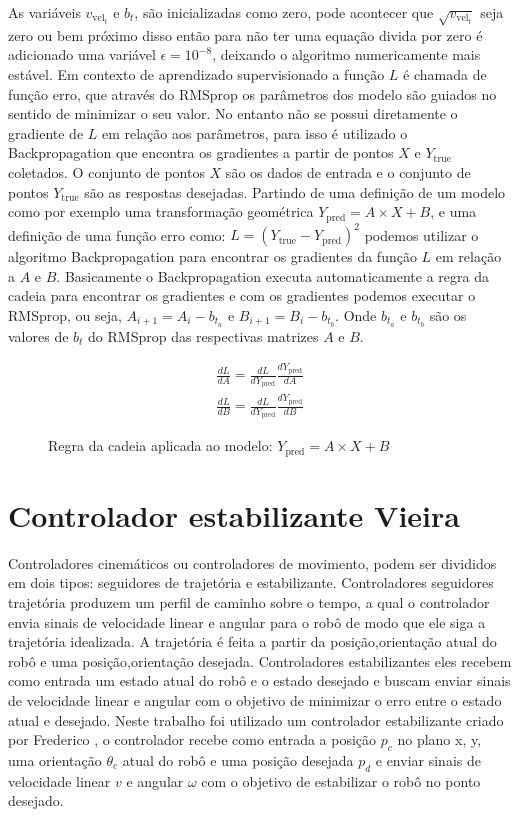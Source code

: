 As variáveis $v_{\text{vel}_t}$ e  $b_t$, são inicializadas como zero, pode acontecer
que  $\sqrt{v_{\text{vel}_t}}$ seja zero ou bem próximo disso então para não ter uma equação
divida por zero é adicionado uma variável $\epsilon =10^{-8}$, deixando o algoritmo numericamente
mais estável. Em contexto de aprendizado supervisionado a função $L$ é chamada de função erro, que 
através do RMSprop os parâmetros dos modelo são guiados no sentido de minimizar o seu valor.
No entanto não se possui diretamente o gradiente de $L$ em relação aos parâmetros, para isso
é utilizado o  Backpropagation que encontra os gradientes a partir
de pontos $X$ e $Y_{\text{true}}$ coletados. O conjunto de pontos $X$ são
os dados de entrada
e o conjunto de pontos  $Y_{\text{true}}$ são as respostas desejadas.
Partindo de  uma definição de um modelo como por exemplo uma
transformação geométrica $Y_{\text{pred}}= A \times X + B$, e uma definição de uma função
erro como: $L=(Y_{\text{true}}- Y_{\text{pred}})^2$ podemos utilizar o algoritmo
Backpropagation para encontrar os gradientes da função $L$ em relação a $A$
e  $B$. Basicamente o Backpropagation executa automaticamente a regra da cadeia
para encontrar os gradientes e com os gradientes podemos executar o RMSprop,
ou seja, $A_{i+1} = A_i -b_{t_a}$ e $B_{i+1} = B_i -b_{t_b}$. Onde $b_{t_a}$ e $b_{t_b}$
são os valores de $b_{t}$ do RMSprop das respectivas matrizes $A$ e $B$.

\begin{figure}[H]
    \begin{align*}
        \frac{dL}{dA } = \frac{dL}{dY_{\text{pred}} } \frac{dY_{\text{pred}}}{dA}  \\
        \frac{dL}{dB } = \frac{dL}{dY_{\text{pred}} } \frac{dY_{\text{pred}}}{dB} 
    \end{align*}
    \caption{Regra da cadeia aplicada ao modelo: $Y_{\text{pred}}= A \times X + B$ }
\end{figure}

\section{Controlador estabilizante Vieira}
Controladores cinemáticos ou controladores de movimento, podem ser 
divididos em dois tipos: seguidores de trajetória e estabilizante.
Controladores seguidores trajetória produzem um perfil
de caminho sobre o tempo, a qual o controlador envia sinais de
velocidade linear e angular para o robô de modo que ele siga a
trajetória idealizada. 
A trajetória é feita a partir da posição,orientação atual do robô e uma posição,orientação desejada.
Controladores estabilizantes eles recebem como entrada um estado atual do robô e o estado desejado
e buscam enviar sinais de velocidade linear e angular com o objetivo
de minimizar o erro entre o estado atual e desejado. Neste trabalho
foi utilizado um controlador estabilizante criado por Frederico
\cite{vieira2006controle}, o controlador recebe como entrada a posição
$p_c$  no plano x, y, uma orientação $\theta_c$ atual do robô e uma
posição desejada $p_d$ e enviar sinais de velocidade linear $v$ e
angular $\omega$ com o objetivo de estabilizar o robô no ponto desejado.

